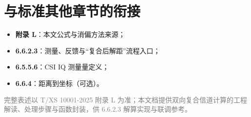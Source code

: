 \documentclass[11pt,a4paper]{ctexart}
\begin{document}
\section{与标准其他章节的衔接}

\begin{itemize}[nosep]
  \item \textbf{附录 L}：本文公式与消偏方法来源；
  \item \textbf{6.6.2.3}：测量、反馈与``复合后解距''流程入口；
  \item \textbf{6.5.5.6}：CSI IQ 测量量定义；
  \item \textbf{6.6.4}：距离到坐标（可选）。
\end{itemize}

\vfill
\begin{center}
\small\textcolor{gray}{完整表述以 T/XS 10001-2025 附录 L 为准；本文档提供双向复合信道计算的工程解读、处理步骤与函数封装，供 6.6.2.3 解算实现与联调参考。}
\end{center}
\end{document}
